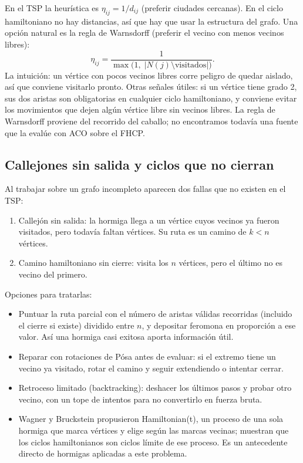 En el TSP la heurística es $\eta_{ij}=1/d_{ij}$ (preferir ciudades cercanas). En el ciclo
hamiltoniano no hay distancias, así que hay que usar la estructura del grafo.
\prop{} Una opción natural es la regla de Warnsdorff (preferir el vecino con menos vecinos
libres):
\[
  \eta_{ij}=\frac{1}{\max\bigl(1,\;|N(j)\setminus\text{visitados}|\bigr)}.
\]
La intuición: un vértice con pocos vecinos libres corre peligro de quedar aislado, así que
conviene visitarlo pronto. Otras señales útiles: si un vértice tiene grado 2, sus dos
aristas son obligatorias en cualquier ciclo hamiltoniano, y conviene evitar los
movimientos que dejen algún vértice libre sin vecinos libres. \duda{} La regla de Warnsdorff proviene del recorrido del
caballo; no encontramos todavía una fuente que la evalúe con ACO sobre el FHCP.

\subsection{Callejones sin salida y ciclos que no cierran}

Al trabajar sobre un grafo incompleto aparecen dos fallas que no existen en el TSP:
\begin{enumerate}
  \item Callejón sin salida: la hormiga llega a un vértice cuyos vecinos ya fueron
        visitados, pero todavía faltan vértices. Su ruta es un camino de $k<n$ vértices.
  \item Camino hamiltoniano sin cierre: visita los $n$ vértices, pero el último no
        es vecino del primero.
\end{enumerate}
Opciones para tratarlas:
\begin{itemize}[nosep]
  \item \prop{} Puntuar la ruta parcial con el número de aristas válidas recorridas
        (incluido el cierre si existe) dividido entre $n$, y depositar feromona en
        proporción a ese valor. Así una hormiga casi exitosa aporta información útil.
  \item \prop{} Reparar con rotaciones de Pósa \cite{aco10} antes de evaluar: si el extremo
        tiene un vecino ya visitado, rotar el camino y seguir extendiendo o intentar cerrar.
  \item \prop{} Retroceso limitado (backtracking): deshacer los últimos pasos
        y probar otro vecino, con un tope de intentos para no convertirlo en fuerza bruta.
  \item Wagner y Bruckstein \cite{aco12} propusieron Hamiltonian(t), un proceso de una sola
        hormiga que marca vértices y elige según las marcas vecinas; muestran que los
        ciclos hamiltonianos son ciclos límite de ese proceso. Es un antecedente directo de
        hormigas aplicadas a este problema.
\end{itemize}

